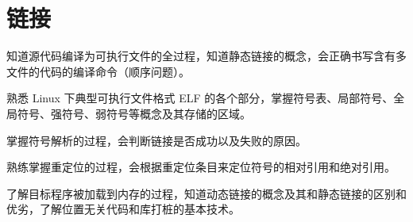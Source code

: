 \chapter{链接}
    \begin{summary}
        \begin{compactitem}
            \item 知道源代码编译为可执行文件的全过程，知道静态链接的概念，会正确书写含有多文件的代码的编译命令（顺序问题）。
            \item 熟悉 Linux 下典型可执行文件格式 ELF 的各个部分，掌握符号表、局部符号、全局符号、强符号、弱符号等概念及其存储的区域。
            \item 掌握符号解析的过程，会判断链接是否成功以及失败的原因。
            \item 熟练掌握重定位的过程，会根据重定位条目来定位符号的相对引用和绝对引用。
            \item 了解目标程序被加载到内存的过程，知道动态链接的概念及其和静态链接的区别和优劣，了解位置无关代码和库打桩的基本技术。
        \end{compactitem}
    \end{summary}

